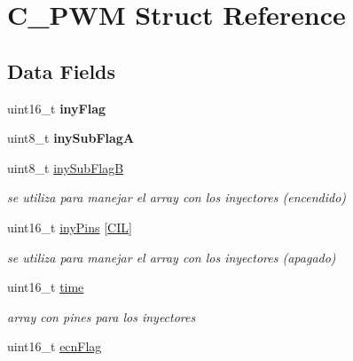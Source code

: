 \hypertarget{structC__PWM}{}\section{C\+\_\+\+P\+WM Struct Reference}
\label{structC__PWM}
\subsection*{Data Fields}
\begin{DoxyCompactItemize}
\item 
uint16\+\_\+t {\bfseries iny\+Flag}\hypertarget{structC__PWM_abea181b6b90f476a8082a31a92574003}{}\label{structC__PWM_abea181b6b90f476a8082a31a92574003}

\item 
uint8\+\_\+t {\bfseries iny\+Sub\+FlagA}\hypertarget{structC__PWM_ab3ae7f2def7b17f3fcd3ae8164e2ec81}{}\label{structC__PWM_ab3ae7f2def7b17f3fcd3ae8164e2ec81}

\item 
uint8\+\_\+t \hyperlink{structC__PWM_afea15442fe64fbfb915cefd6538bc1b9}{iny\+Sub\+FlagB}\hypertarget{structC__PWM_afea15442fe64fbfb915cefd6538bc1b9}{}\label{structC__PWM_afea15442fe64fbfb915cefd6538bc1b9}

\begin{DoxyCompactList}\small\item\em se utiliza para manejar el array con los inyectores (encendido) \end{DoxyCompactList}\item 
uint16\+\_\+t \hyperlink{structC__PWM_a971dcd6bcf8df62e73d10b7b0c2cd3e3}{iny\+Pins} \mbox{[}\hyperlink{defines_8h_a45f252e6f7774e84484118243dfe45b4}{C\+IL}\mbox{]}\hypertarget{structC__PWM_a971dcd6bcf8df62e73d10b7b0c2cd3e3}{}\label{structC__PWM_a971dcd6bcf8df62e73d10b7b0c2cd3e3}

\begin{DoxyCompactList}\small\item\em se utiliza para manejar el array con los inyectores (apagado) \end{DoxyCompactList}\item 
uint16\+\_\+t \hyperlink{structC__PWM_aef386c055cd62c75702d2866bbb1b7b6}{time}\hypertarget{structC__PWM_aef386c055cd62c75702d2866bbb1b7b6}{}\label{structC__PWM_aef386c055cd62c75702d2866bbb1b7b6}

\begin{DoxyCompactList}\small\item\em array con pines para los inyectores \end{DoxyCompactList}\item 
uint16\+\_\+t \hyperlink{structC__PWM_a6b4fd2b57fa098738a9151c875fcef5d}{ecn\+Flag}\hypertarget{structC__PWM_a6b4fd2b57fa098738a9151c875fcef5d}{}\label{structC__PWM_a6b4fd2b57fa098738a9151c875fcef5d}


\end{DoxyCompactItemize}
